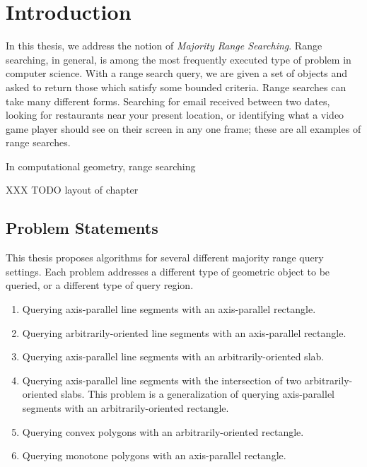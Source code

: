 \chapter{Introduction}
\label{:intro}

In this thesis, we address the notion of \emph{Majority Range Searching}.  Range searching, in general, is among the most frequently executed type of problem in computer science. With a range search query, we are given a set of objects and asked to return those which satisfy some bounded criteria. Range searches can take many different forms. Searching for email received between two dates, looking for restaurants near your present location, or identifying what a video game player should see on their screen in any one frame; these are all examples of range searches.

In computational geometry, range searching 

XXX TODO layout of chapter


\section{Problem Statements}
\label{:introduction:problems}

This thesis proposes algorithms for several different majority range query settings.  Each problem addresses a different type of geometric object to be queried, or a different type of query region.

\begin{enumerate}
\item Querying axis-parallel line segments with an axis-parallel rectangle.

\item Querying arbitrarily-oriented line segments with an axis-parallel rectangle.

\item Querying axis-parallel line segments with an arbitrarily-oriented slab.

\item Querying axis-parallel line segments with the intersection of two arbitrarily-oriented slabs. This problem is a generalization of querying axis-parallel segments with an arbitrarily-oriented rectangle.

\item Querying convex polygons with an arbitrarily-oriented rectangle.

\item Querying monotone polygons with an axis-parallel rectangle.
\end{enumerate}



